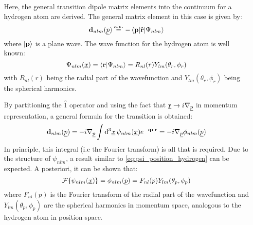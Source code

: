 
\label{sec:dipolematrixelements}

Here, the general transition dipole matrix elements into the continuum for a hydrogen atom are derived.     %
The general matrix element in this case is given by:
\begin{equation*}
    \mathbf{d}_{nlm}(\underline{p}) \stackrel{\mathrm{a.u.}}{=} -\braket{\mathbf{p}|\mathbf{\hat{r}}|\Psi_{nlm}}
\end{equation*}
where $\ket{\mathbf{p}}$ is a plane wave.
The wave function for the hydrogen atom is well known:
\begin{equation}
    \Psi_{nlm}(\underline{x}) = \braket{\mathbf{r}|\Psi_{nlm}} = R_{nl}(r)Y_{lm}(\theta_r, \phi_r) \label{eq:psi_position_hydrogen}
\end{equation}
with $R_{nl}(r)$ being the radial part of the wavefunction and $Y_{lm}(\theta_r, \phi_r)$ being the spherical harmonics.

By partitioning the $\hat{1}$ operator and using the fact that $\mathbf{\underline{r}} \rightarrow i\nabla_{\underline{p}}$ %
in momentum representation, a general formula for the transition is obtained:
\begin{equation*}
    \mathbf{d}_{nlm}(\underline{p}) = -i\nabla_{\underline{p}}\int \mathrm{d}^3\underline{x}\,\psi_{nlm}(\underline{x}) e^{-i\mathbf{p}\cdot\mathbf{r}} = -i\nabla_{\underline{p}}\phi_{nlm}(\underline{p})
\end{equation*}
In principle, this integral (i.e the Fourier transform) is all that is required.
Due to the structure of $\psi_{nlm}$, a result similar to \eqref{eq:psi_position_hydrogen} can be expected.
A posteriori, it can be shown that:
\begin{equation*}
    \mathcal{F}\{\psi_{nlm}(\underline{x})\} = \phi_{nlm}(\underline{p}) = F_{nl}(p)Y_{lm}(\theta_p, \phi_p)
\end{equation*}
where $F_{nl}(p)$ is the Fourier transform of the radial part of the wavefunction and $Y_{lm}(\theta_p, \phi_p)$ are the spherical harmonics in momentum space, analogous to the hydrogen atom in position space.






